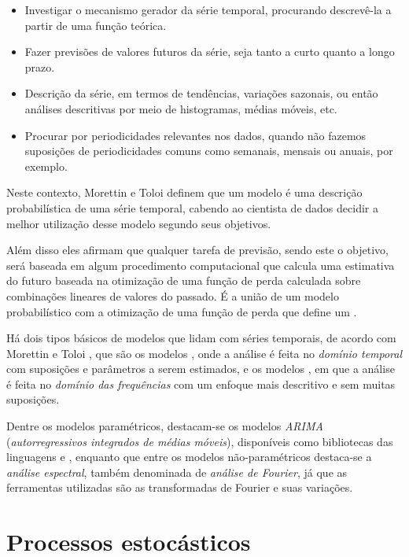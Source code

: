 \begin{itemize}
	\item{Investigar o mecanismo gerador da série temporal, procurando descrevê-la a partir de uma função teórica.}
	\item{Fazer previsões de valores futuros da série, seja tanto a curto quanto a longo prazo.}
	\item{Descrição da série, em termos de tendências, variações sazonais, ou então análises descritivas por meio de histogramas, médias móveis, etc.}
	\item{Procurar por periodicidades relevantes nos dados, quando não fazemos suposições de periodicidades comuns como semanais, mensais ou anuais, por exemplo.}
\end{itemize}

Neste contexto, Morettin e Toloi \citep{morettin} definem que um modelo é uma descrição probabilística de uma série temporal, cabendo ao cientista de dados decidir a melhor utilização desse modelo segundo seus objetivos. 

Além disso eles afirmam que qualquer tarefa de previsão, sendo este o objetivo, será baseada em algum procedimento computacional que calcula uma estimativa do futuro baseada na otimização de uma função de perda calculada sobre combinações lineares de valores do passado. É a união de um modelo probabilístico com a otimização de uma função de perda que define um .

Há dois tipos básicos de modelos que lidam com séries temporais, de acordo com Morettin e Toloi \citep{morettin}, que são os modelos , onde a análise é feita no \emph{domínio temporal} com suposições e parâmetros a serem estimados, e os modelos , em que a análise é feita no \emph{domínio das frequências} com um enfoque mais descritivo e sem muitas suposições.

Dentre os modelos paramétricos, destacam-se os modelos \emph{ARIMA} (\emph{autorregressivos integrados de médias móveis}), disponíveis como bibliotecas das linguagens  e , enquanto que entre os modelos não-paramétricos destaca-se a \emph{análise espectral}, também denominada de \emph{análise de Fourier}, já que as ferramentas utilizadas são as transformadas de Fourier e suas variações.

\section{Processos estocásticos}

